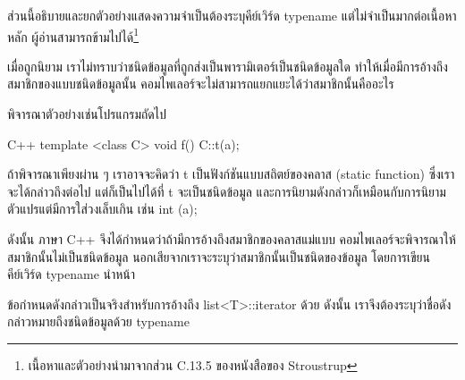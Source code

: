 ส่วน{\wbr}นี้{\wbr}อธิบาย{\wbr}และ{\wbr}ยก{\wbr}ตัวอย่าง{\wbr}แสดง{\wbr}ความจำ{\wbr}เป็น{\wbr}ต้อง{\wbr}ระบุ{\wbr}คีย์{\wbr}เวิร์ด {\ct typename}
แต่{\wbr}ไม่{\wbr}จำเป็น{\wbr}มาก{\wbr}ต่อ{\wbr}เนื้อหา{\wbr}หลัก{\wbr}
ผู้อ่าน{\wbr}สามารถ{\wbr}ข้าม{\wbr}ไป{\wbr}ได้\footnote{เนื้อหา{\wbr}และ{\wbr}ตัวอย่าง{\wbr}นำมา{\wbr}จาก{\wbr}ส่วน C.13.5 ของ{\wbr}หนังสือ{\wbr}ของ{\wbr}
  Stroustrup}

เมื่อ{\wbr}ถูก{\wbr}นิยาม เรา{\wbr}ไม่{\wbr}ทราบ{\wbr}ว่า{\wbr}ชนิด{\wbr}ข้อมูล{\wbr}ที่{\wbr}ถูก{\wbr}ส่ง{\wbr}เป็น{\wbr}พารามิเตอร์{\wbr}เป็น{\wbr}ชนิด{\wbr}ข้อมูล{\wbr}ใด{\wbr}
ทำ{\wbr}ให้{\wbr}เมื่อ{\wbr}มี{\wbr}การ{\wbr}อ้าง{\wbr}ถึง{\wbr}สมาชิก{\wbr}ของ{\wbr}แบบ{\wbr}ชนิด{\wbr}ข้อมูล{\wbr}นั้น{\wbr}
คอม{\wbr}ไพ{\wbr}เลอร์{\wbr}จะ{\wbr}ไม่{\wbr}สามารถ{\wbr}แยกแยะ{\wbr}ได้{\wbr}ว่า{\wbr}สมาชิก{\wbr}นั้น{\wbr}คือ{\wbr}อะไร{\wbr}

พิจารณา{\wbr}ตัวอย่าง{\wbr}เช่น{\wbr}โปรแกรม{\wbr}ถัด{\wbr}ไป{\wbr}

\latintext
\begin{codelist}{C++}{}
template <class C> void f()
{
  C::t(a);
}
\end{codelist}
\thaitext

ถ้า{\wbr}พิจารณา{\wbr}เพียง{\wbr}ผ่าน ๆ เรา{\wbr}อาจ{\wbr}จะ{\wbr}คิด{\wbr}ว่า {\ct t} เป็น{\wbr}ฟังก์ชัน{\wbr}แบบ{\wbr}สถิตย์{\wbr}ของ{\wbr}ค{\wbr}ลา{\wbr}ส (static
function) ซึ่ง{\wbr}เรา{\wbr}จะ{\wbr}ได้{\wbr}กล่าว{\wbr}ถึง{\wbr}ต่อไป แต่{\wbr}ก็{\wbr}เป็น{\wbr}ไป{\wbr}ได้{\wbr}ที่ {\ct t} จะ{\wbr}เป็น{\wbr}ชนิด{\wbr}ข้อมูล{\wbr}
และ{\wbr}การ{\wbr}นิยาม{\wbr}ดังกล่าว{\wbr}ก็{\wbr}เหมือน{\wbr}กับ{\wbr}การ{\wbr}นิยาม{\wbr}ตัวแปร{\wbr}แต่{\wbr}มี{\wbr}การ{\wbr}ใส่{\wbr}วงเล็บ{\wbr}เกิน เช่น {\ct int (a);}

ดังนั้น ภาษา C++ จึง{\wbr}ได้{\wbr}กำหนด{\wbr}ว่า{\wbr}ถ้า{\wbr}มี{\wbr}การ{\wbr}อ้าง{\wbr}ถึง{\wbr}สมาชิก{\wbr}ของ{\wbr}ค{\wbr}ลา{\wbr}ส{\wbr}แม่แบบ{\wbr}
คอม{\wbr}ไพ{\wbr}เลอร์{\wbr}จะ{\wbr}พิจารณา{\wbr}ให้{\wbr}สมาชิก{\wbr}นั้น{\wbr}ไม่{\wbr}เป็น{\wbr}ชนิด{\wbr}ข้อมูล{\wbr}
นอก{\wbr}เสีย{\wbr}จาก{\wbr}เรา{\wbr}จะ{\wbr}ระบุ{\wbr}ว่า{\wbr}สมาชิก{\wbr}นั้น{\wbr}เป็น{\wbr}ชนิด{\wbr}ของ{\wbr}ข้อมูล โดย{\wbr}การ{\wbr}เขียน{\wbr}คีย์{\wbr}เวิร์ด {\ct
  typename} นำหน้า{\wbr}

ข้อกำหนด{\wbr}ดังกล่าว{\wbr}เป็นจริง{\wbr}สำหรับ{\wbr}การ{\wbr}อ้าง{\wbr}ถึง {\ct list<T>::iterator} ด้วย ดังนั้น{\wbr}
เรา{\wbr}จึง{\wbr}ต้อง{\wbr}ระบุ{\wbr}ว่า{\wbr}ชื่อดัง{\wbr}กล่าว{\wbr}หมายถึง{\wbr}ชนิด{\wbr}ข้อมูล{\wbr}ด้วย {\ct typename}

